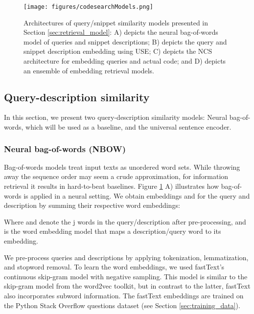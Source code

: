 \documentclass[12pt,conference, onecolumn]{IEEEtran}
\begin{document}
\begin{figure}
\texttt{[image: figures/codesearchModels.png]}
\caption{Architectures of query/snippet similarity models presented in Section \ref{sec:retrieval_model}: A) depicts the neural bag-of-words model of queries and snippet descriptions; B) depicts the query and snippet description embedding using USE; C) depicts the NCS architecture for embedding queries and actual code; and D) depicts an ensemble of embedding retrieval models.}
\label{fig:codesearchModels}
\end{figure}

\subsection{Query-description similarity}\label{sec:descr_sim}
In this section, we present two query-description similarity models: Neural bag-of-words, which will be used as a baseline, and the universal sentence encoder. 

\subsubsection*{Neural bag-of-words (NBOW)}
Bag-of-words models treat input texts as unordered word sets. While throwing away the sequence order may seem a crude approximation, for information retrieval it results in hard-to-beat baselines. Figure \ref{fig:codesearchModels} A) illustrates how bag-of-words is applied in a neural setting. We obtain embeddings   and  for the query  and description  by summing their respective word embeddings: 



Where  and  denote the j words in the query/description after pre-processing, and  is the word embedding model that maps a description/query word to its embedding.

We pre-process queries and descriptions by applying tokenization, lemmatization, and stopword removal. To learn the word embeddings, we used fastText's~\cite{Bojanowski2016} continuous skip-gram model with negative sampling. This model is similar to the skip-gram model from the word2vec toolkit, but in contrast to the latter, fastText also incorporates subword information. The fastText embeddings are trained on the Python Stack Overflow questions dataset (see Section \ref{sec:training_data}).
\end{document}
